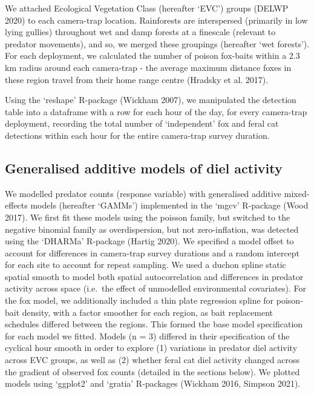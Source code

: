 \documentclass[]{elsarticle} %
\begin{document}
We attached Ecological Vegetation Class (hereafter `EVC') groups (DELWP 2020) to each camera-trap location. Rainforests are interspersed (primarily in low lying gullies) throughout wet and damp forests at a finescale (relevant to predator movements), and so, we merged these groupings (hereafter `wet forests'). For each deployment, we calculated the number of poison fox-baits within a 2.3 km radius around each camera-trap - the average maximum distance foxes in these region travel from their home range centre (Hradsky et al. 2017).

Using the `reshape' R-package (Wickham 2007), we manipulated the detection table into a dataframe with a row for each hour of the day, for every camera-trap deployment, recording the total number of `independent' fox and feral cat detections within each hour for the entire camera-trap survey duration.

\hypertarget{generalised-additive-models-of-diel-activity}{%
\subsection{Generalised additive models of diel activity}\label{generalised-additive-models-of-diel-activity}}

We modelled predator counts (response variable) with generalised additive mixed-effects models (hereafter `GAMMs') implemented in the `mgcv' R-package (Wood 2017). We first fit these models using the poisson family, but switched to the negative binomial family as overdispersion, but not zero-inflation, was detected using the `DHARMa' R-package (Hartig 2020). We specified a model offset to account for differences in camera-trap survey durations and a random intercept for each site to account for repeat sampling. We used a duchon spline static spatial smooth to model both spatial autocorrelation and differences in predator activity across space (i.e.~the effect of unmodelled environmental covariates). For the fox model, we additionally included a thin plate regression spline for poison-bait density, with a factor smoother for each region, as bait replacement schedules differed between the regions. This formed the base model specification for each model we fitted. Models (n = 3) differed in their specification of the cyclical hour smooth in order to explore (1) variations in predator diel activity across EVC groups, as well as (2) whether feral cat diel activity changed across the gradient of observed fox counts (detailed in the sections below). We plotted models using `ggplot2' and `gratia' R-packages (Wickham 2016, Simpson 2021).
\end{document}
